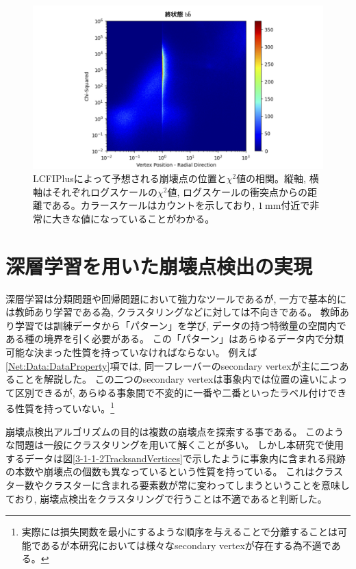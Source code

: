 \begin{figure}[htbp]
 \centering
 \includegraphics[width=1.0\textwidth, clip]{Figure/3Networks/3-1-2-4VertexPositionsvsChiSquare.png}
 \caption[LCFIPlusによって予想される崩壊点の位置と$\chi^2$値の相関]{LCFIPlusによって予想される崩壊点の位置と$\chi^2$値の相関。縦軸, 横軸はそれぞれログスケールの$\chi^2$値, ログスケールの衝突点からの距離である。カラースケールはカウントを示しており, $1\ \mathrm{mm}$付近で非常に大きな値になっていることがわかる。}
 \label{3-1-2-4VertexPositionsvsChiSquare}
\end{figure}

\newpage
\section{深層学習を用いた崩壊点検出の実現} \label{Net:forVertexFinderwithDL}

深層学習は分類問題や回帰問題において強力なツールであるが, 一方で基本的には教師あり学習である為, クラスタリングなどに対しては不向きである。
教師あり学習では訓練データから「パターン」を学び, データの持つ特徴量の空間内である種の境界を引く必要がある。
この「パターン」はあらゆるデータ内で分類可能な決まった性質を持っていなければならない。
例えば\ref{Net:Data:DataProperty}項では, 同一フレーバーのsecondary vertexが主に二つあることを解説した。
この二つのsecondary vertexは事象内では位置の違いによって区別できるが, あらゆる事象間で不変的に一番や二番といったラベル付けできる性質を持っていない。\footnote{実際には損失関数を最小にするような順序を与えることで分離することは可能であるが本研究においては様々なsecondary vertexが存在する為不適である。}

崩壊点検出アルゴリズムの目的は複数の崩壊点を探索する事である。
このような問題は一般にクラスタリングを用いて解くことが多い。
しかし本研究で使用するデータは図\ref{3-1-1-2TracksandVertices}で示したように事象内に含まれる飛跡の本数や崩壊点の個数も異なっているという性質を持っている。
これはクラスター数やクラスターに含まれる要素数が常に変わってしまうということを意味しており, 崩壊点検出をクラスタリングで行うことは不適であると判断した。


